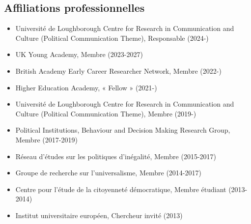 \documentclass[letterpaper,fontsize=10.5pt]{scrartcl}
\begin{document}
\subsection{Affiliations professionnelles}
\vspace{-.25em}
\begin{itemize}[itemsep=0em, topsep=0em, partopsep=0em]
	\item Université de Loughborough Centre for Research in Communication and Culture (Political Communication Theme), Responsable (2024-)
	\item UK Young Academy, Membre (2023-2027)
	\item British Academy Early Career Researcher Network, Membre (2022-)
	\item Higher Education Academy, « Fellow » (2021-)
	\item Université de Loughborough Centre for Research in Communication and Culture (Political Communication Theme), Membre (2019-)
	\item Political Institutions, Behaviour and Decision Making Research Group, Membre (2017-2019)
	\item Réseau d’études sur les politiques d'inégalité, Membre (2015-2017)
	\item Groupe de recherche sur l'universalisme, Membre (2014-2017)
	\item Centre pour l’étude de la citoyenneté démocratique, Membre étudiant (2013-2014)
	\item Institut universitaire européen, Chercheur invité (2013)\\
\end{itemize}
\end{document}
